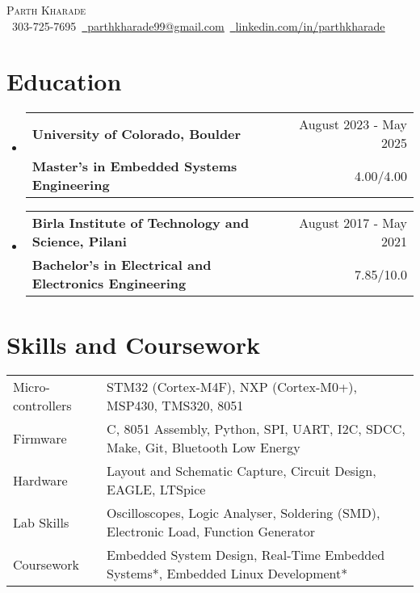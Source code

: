 \documentclass[11pt]{article}
\makeatletter
\newcommand{\resumeSubheading}[4]{
  \vspace{-2pt}\item
    \begin{tabular*}{1.0\textwidth}[t]{l@{\extracolsep{\fill}}r}
       {\large \textbf{#1}}&{\large #2} \\
      \textbf{#3}&{ #4} \\
    \end{tabular*}\vspace{-1pt}
}
\newcommand{\resumeSubHeadingListStart}{\begin{itemize}[leftmargin=0.0in, label={}]}
\newcommand{\resumeSubHeadingListEnd}{\end{itemize}}
\makeatother
\begin{document}
\setlength{\footskip}{4.1pt}
\begin{center}
    {\Huge \scshape Parth Kharade} \\ \vspace{1pt}
    \small \raisebox{-0.1\height}\faPhone\ 303-725-7695{\hspace{0.1cm}}~\href{mailto:parthkharade99@gmail.com}{\raisebox{-0.2\height}\faEnvelope\ \underline{parthkharade99@gmail.com}}~{\hspace{0.1cm}}\href{https://www.linkedin.com/in/parth-k-081287184/}{\raisebox{-0.2\height}\faLinkedin\ \underline{linkedin.com/in/parthkharade}}
    \vspace{-10pt}
\end{center}


\section {Education}
  \resumeSubHeadingListStart
    \resumeSubheading
      {University of Colorado, Boulder}{August 2023 - May 2025}
      {Master's in Embedded Systems Engineering}{4.00/4.00}
      \vspace{-0.1in}
    \resumeSubheading
      {Birla Institute of Technology and Science, Pilani}{August 2017 - May 2021}
      {Bachelor's in Electrical and Electronics Engineering}{7.85/10.0}
  \resumeSubHeadingListEnd
 \vspace{-16pt}
 \section{Skills and Coursework}
 \vspace{-4mm}
\begin{table}[!htb]
    \begin{tabular} { m{3.1cm} | m{16cm} } 
      {Micro-controllers}&{\: STM32 (Cortex-M4F), NXP (Cortex-M0+), MSP430, TMS320, 8051} \\
      {Firmware}&{\: C, 8051 Assembly, Python, SPI, UART, I2C, SDCC, Make, Git, Bluetooth Low Energy} \\
      {Hardware}&{\: Layout and Schematic Capture, Circuit Design, EAGLE, LTSpice} \\
      {Lab Skills}&{\: Oscilloscopes, Logic Analyser, Soldering (SMD), Electronic Load, Function Generator} \\
      {Coursework}&{\: Embedded System Design, Real-Time Embedded Systems*, Embedded Linux Development*} \\
    \end{tabular}
\end{table}
 \vspace{-16pt}
\end{document}
